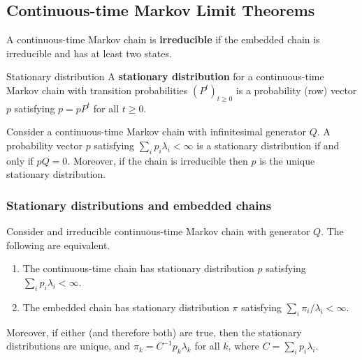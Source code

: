 \subsection{Continuous-time Markov Limit Theorems}

\begin{defn}{}{}
A continuous-time Markov chain is \textbf{irreducible} if the embedded chain is irreducible and has at least two states.
\end{defn}

\begin{defn}{Stationary distribution}{}
A \textbf{stationary distribution} for a continuous-time Markov chain with transition probabilities \((P^t)_{t \geq 0}\) is a probability (row) vector \(p\) satisfying \(p  = pP^t\) for all \(t \geq 0\). 
\end{defn}

\begin{thrm}{}{}
Consider a continuous-time Markov chain with infinitesimal generator \(Q\). A probability vector \(p\) satisfying \(\sum_{i} p _{i} \lambda _{i} < \infty \) is  a stationary distribution if and only if \(pQ = 0\). Moreover, if the chain is irreducible then \(p\) is the unique stationary distribution. 
\end{thrm}

\subsubsection{Stationary distributions and embedded chains}

\begin{cor}{}{}
Consider and irreducible continuous-time Markov chain with generator \(Q\). The following are equivalent. 
\begin{enumerate}
    \item The continuous-time chain has stationary distribution \(p\) satisfying \(\sum_{i} p _{i} \lambda _{i} < \infty \). 
    \item The embedded chain has stationary distribution \(\pi  \) satisfying \(\sum_{i} \pi _{i} / \lambda _{i} < \infty \). 
\end{enumerate}
Moreover, if either (and therefore both) are true, then the stationary distributions are unique, and \(\pi _{k} = C ^{-1} p_{k} \lambda _{k} \) for all \(k\), where \(C = \sum_{i} p _{i} \lambda _{i} \). 
\end{cor}